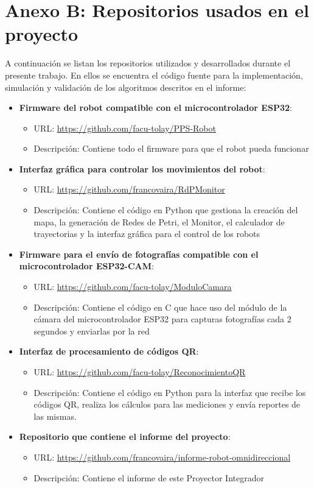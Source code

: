 \newpage
\section{Anexo B: Repositorios usados en el proyecto}

A continuación se listan los repositorios utilizados y desarrollados durante el presente trabajo. En ellos se encuentra el código fuente para la implementación, simulación y validación de los algoritmos descritos en el informe:

\begin{itemize}
  \item \textbf{Firmware del robot compatible con el microcontrolador ESP32}:
  \begin{itemize}
    \item URL: \url{https://github.com/facu-tolay/PPS-Robot}
    \item Descripción: Contiene todo el firmware para que el robot pueda funcionar
  \end{itemize}

    \item \textbf{Interfaz gráfica para controlar los movimientos del robot}:
  \begin{itemize}
    \item URL: \url{https://github.com/francovaira/RdPMonitor}
    \item Descripción: Contiene el código en Python que gestiona la creación del mapa, la generación de Redes de Petri, el Monitor, el calculador de trayectorias y la interfaz gráfica para el control de los robots
  \end{itemize}

    \item \textbf{Firmware para el envío de fotografías compatible con el microcontrolador ESP32-CAM}:
  \begin{itemize}
    \item URL: \url{https://github.com/facu-tolay/ModuloCamara}
    \item Descripción: Contiene el código en C que hace uso del módulo de la cámara del microcontrolador ESP32 para capturas fotografías cada 2 segundos y enviarlas por la red
  \end{itemize}

    \item \textbf{Interfaz de procesamiento de códigos QR}:
  \begin{itemize}
    \item URL: \url{https://github.com/facu-tolay/ReconocimientoQR}
    \item Descripción: Contiene el código en Python para la interfaz que recibe los códigos QR, realiza los cálculos para las mediciones y envía reportes de las mismas.
  \end{itemize}

    \item \textbf{Repositorio que contiene el informe del proyecto}:
  \begin{itemize}
    \item URL: \url{https://github.com/francovaira/informe-robot-omnidireccional}
    \item Descripción: Contiene el informe de este Proyector Integrador
  \end{itemize}
\end{itemize}